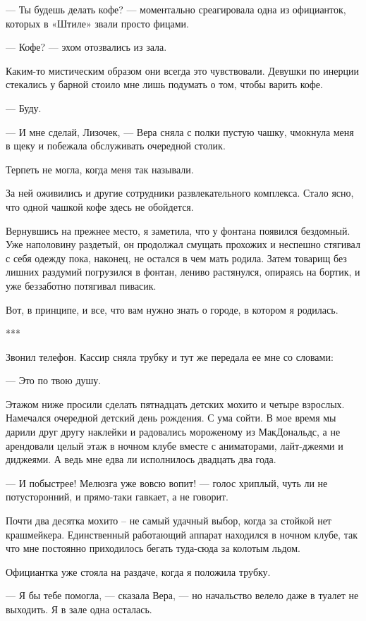 \documentclass[
]{book}
\begin{document}
--- Ты будешь делать кофе? --- моментально среагировала одна из официанток, которых в «Штиле» звали просто фицами.

--- Кофе? --- эхом отозвались из зала.

Каким-то мистическим образом они всегда это чувствовали. Девушки по инерции стекались у барной стоило мне лишь подумать о том, чтобы варить кофе.

--- Буду.

--- И мне сделай, Лизочек, --- Вера сняла с полки пустую чашку, чмокнула меня в щеку и побежала обслуживать очередной столик.

Терпеть не могла, когда меня так называли.

За ней оживились и другие сотрудники развлекательного комплекса. Стало ясно, что одной чашкой кофе здесь не обойдется.

Вернувшись на прежнее место, я заметила, что у фонтана появился бездомный. Уже наполовину раздетый, он продолжал смущать прохожих и неспешно стягивал с себя одежду пока, наконец, не остался в чем мать родила. Затем товарищ без лишних раздумий погрузился в фонтан, лениво растянулся, опираясь на бортик, и уже беззаботно потягивал пивасик.

Вот, в принципе, и все, что вам нужно знать о городе, в котором я родилась.

***

Звонил телефон. Кассир сняла трубку и тут же передала ее мне со словами:

--- Это по твою душу.

Этажом ниже просили сделать пятнадцать детских мохито и четыре взрослых. Намечался очередной детский день рождения. С ума сойти. В мое время мы дарили друг другу наклейки и радовались мороженому из МакДональдс, а не арендовали целый этаж в ночном клубе вместе с аниматорами, лайт-джеями и диджеями. А ведь мне едва ли исполнилось двадцать два года.

--- И побыстрее! Мелюзга уже вовсю вопит! --- голос хриплый, чуть ли не потусторонний, и прямо-таки гавкает, а не говорит.

Почти два десятка мохито -- не самый удачный выбор, когда за стойкой нет крашмейкера. Единственный работающий аппарат находился в ночном клубе, так что мне постоянно приходилось бегать туда-сюда за колотым льдом.

Официантка уже стояла на раздаче, когда я положила трубку.

--- Я бы тебе помогла, --- сказала Вера, --- но начальство велело даже в туалет не выходить. Я в зале одна осталась.
\end{document}
